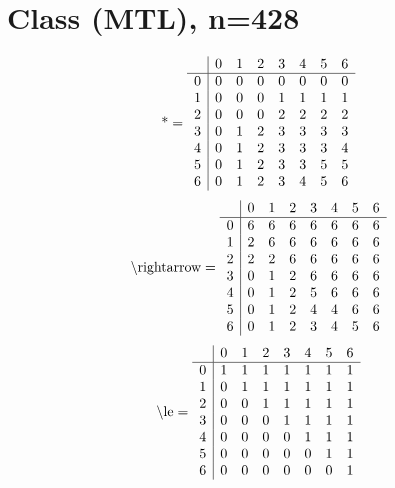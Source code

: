 \documentclass[11pt]{article}
\begin{document}
\section{Class (MTL), n=428}
\[\text{*} = 
\begin{array}{r | r r r r r r r}
 & 0 & 1 & 2 & 3 & 4 & 5 & 6 \\ \hline
0 & 0 & 0 & 0 & 0 & 0 & 0 & 0 \\
1 & 0 & 0 & 0 & 1 & 1 & 1 & 1 \\
2 & 0 & 0 & 0 & 2 & 2 & 2 & 2 \\
3 & 0 & 1 & 2 & 3 & 3 & 3 & 3 \\
4 & 0 & 1 & 2 & 3 & 3 & 3 & 4 \\
5 & 0 & 1 & 2 & 3 & 3 & 5 & 5 \\
6 & 0 & 1 & 2 & 3 & 4 & 5 & 6 \\
\end{array}
\]
\[\text{\textbackslash rightarrow} = 
\begin{array}{r | r r r r r r r}
 & 0 & 1 & 2 & 3 & 4 & 5 & 6 \\ \hline
0 & 6 & 6 & 6 & 6 & 6 & 6 & 6 \\
1 & 2 & 6 & 6 & 6 & 6 & 6 & 6 \\
2 & 2 & 2 & 6 & 6 & 6 & 6 & 6 \\
3 & 0 & 1 & 2 & 6 & 6 & 6 & 6 \\
4 & 0 & 1 & 2 & 5 & 6 & 6 & 6 \\
5 & 0 & 1 & 2 & 4 & 4 & 6 & 6 \\
6 & 0 & 1 & 2 & 3 & 4 & 5 & 6 \\
\end{array}
\]
\[\text{\textbackslash le} = 
\begin{array}{r | r r r r r r r}
 & 0 & 1 & 2 & 3 & 4 & 5 & 6 \\ \hline
0 & 1 & 1 & 1 & 1 & 1 & 1 & 1 \\
1 & 0 & 1 & 1 & 1 & 1 & 1 & 1 \\
2 & 0 & 0 & 1 & 1 & 1 & 1 & 1 \\
3 & 0 & 0 & 0 & 1 & 1 & 1 & 1 \\
4 & 0 & 0 & 0 & 0 & 1 & 1 & 1 \\
5 & 0 & 0 & 0 & 0 & 0 & 1 & 1 \\
6 & 0 & 0 & 0 & 0 & 0 & 0 & 1 \\
\end{array}
\]
\end{document}
